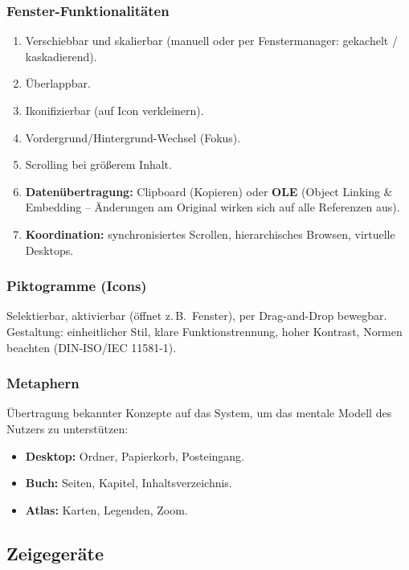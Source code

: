 \documentclass[12pt, a4paper]{article}
\begin{document}
\subsubsection*{Fenster-Funktionalitäten}
\begin{enumerate}
  \item Verschiebbar und skalierbar (manuell oder per Fenstermanager: gekachelt / kaskadierend).
  \item Überlappbar.
  \item Ikonifizierbar (auf Icon verkleinern).
  \item Vordergrund/Hintergrund-Wechsel (Fokus).
  \item Scrolling bei größerem Inhalt.
  \item \textbf{Datenübertragung:} Clipboard (Kopieren) oder \textbf{OLE} (Object Linking \& Embedding -- Änderungen am Original wirken sich auf alle Referenzen aus).
  \item \textbf{Koordination:} synchronisiertes Scrollen, hierarchisches Browsen, virtuelle Desktops.
\end{enumerate}

\subsubsection*{Piktogramme (Icons)}

Selektierbar, aktivierbar (öffnet z.\,B.\ Fenster), per Drag-and-Drop bewegbar. Gestaltung: einheitlicher Stil, klare Funktionstrennung, hoher Kontrast, Normen beachten (DIN-ISO/IEC 11581-1).

\subsubsection*{Metaphern}

Übertragung bekannter Konzepte auf das System, um das mentale Modell des Nutzers zu unterstützen:
\begin{itemize}
  \item \textbf{Desktop:} Ordner, Papierkorb, Posteingang.
  \item \textbf{Buch:} Seiten, Kapitel, Inhaltsverzeichnis.
  \item \textbf{Atlas:} Karten, Legenden, Zoom.
\end{itemize}

\subsection{Zeigegeräte}
\end{document}
